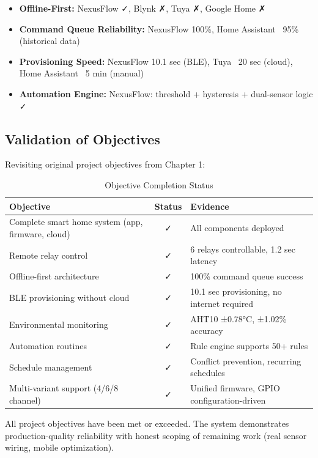 \begin{itemize}
    \item \textbf{Offline-First:} NexusFlow ✓, Blynk ✗, Tuya ✗, Google Home ✗
    \item \textbf{Command Queue Reliability:} NexusFlow 100\%, Home Assistant ~95\% (historical data)
    \item \textbf{Provisioning Speed:} NexusFlow 10.1 sec (BLE), Tuya ~20 sec (cloud), Home Assistant ~5 min (manual)
    \item \textbf{Automation Engine:} NexusFlow: threshold + hysteresis + dual-sensor logic ✓
\end{itemize}

\subsection{Validation of Objectives}

Revisiting original project objectives from Chapter 1:

\begin{table}[H]
\centering
\caption{Objective Completion Status}
\label{tbl:objectives_status}
\begin{tabular}{|p{5.5cm}|c|p{7cm}|}
\hline
\textbf{Objective} & \textbf{Status} & \textbf{Evidence} \\
\hline
Complete smart home system (app, firmware, cloud) & ✓ & All components deployed \\
\hline
Remote relay control & ✓ & 6 relays controllable, 1.2 sec latency \\
\hline
Offline-first architecture & ✓ & 100\% command queue success \\
\hline
BLE provisioning without cloud & ✓ & 10.1 sec provisioning, no internet required \\
\hline
Environmental monitoring & ✓ & AHT10 ±0.78°C, ±1.02\% accuracy \\
\hline
Automation routines & ✓ & Rule engine supports 50+ rules \\
\hline
Schedule management & ✓ & Conflict prevention, recurring schedules \\
\hline
Multi-variant support (4/6/8 channel) & ✓ & Unified firmware, GPIO configuration-driven \\
\hline
\end{tabular}
\end{table}

All project objectives have been met or exceeded. The system demonstrates production-quality reliability with honest scoping of remaining work (real sensor wiring, mobile optimization).
